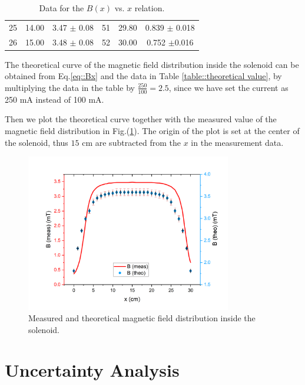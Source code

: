 \documentclass[a4paper]{article}
\begin{document}
\begin{table}[H]
\begin{tabular}{ccc||ccc}
		25 & 14.00                                      & 3.47 $\pm$ 0.08                 & 51 & 29.80                                      & 0.839 $\pm$ 0.018               \\
		26 & 15.00                                      & 3.48 $\pm$ 0.08                 & 52 & 30.00                                      & 0.752 $\pm$0.016                \\
		\hline
	\end{tabular}
	\caption{Data for the $B(x)$ vs. $x$ relation.}\label{TableBx}
\end{table}

The theoretical curve of the magnetic field distribution inside the solenoid can be obtained from Eq.\eqref{eq::Bx} and the data in Table \ref{table::theoretical value}, by multiplying the data in the table by $\frac{250}{100} = 2.5$, since we have set the current as 250 mA instead of 100 mA.

Then we plot the theoretical curve together with the measured value of the magnetic field distribution in Fig.(\ref{fig::theo_and_meas}). 
The origin of the plot is set at the center of the solenoid, thus $15$ cm are subtracted from the $x$ in the measurement data.

\begin{figure}[!htbp]
	\centering
	\includegraphics[width=0.8\textwidth]{theo_and_meas.png}
	\caption{Measured and theoretical magnetic field distribution inside the solenoid.}
	\label{fig::theo_and_meas}
\end{figure}


\section{Uncertainty Analysis}
\end{document}
